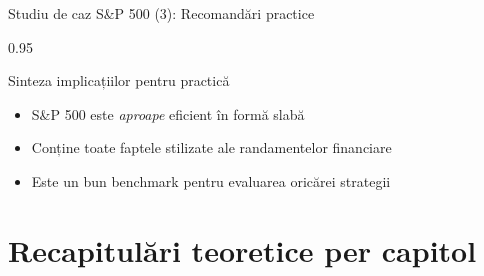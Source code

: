 \documentclass[9pt, aspectratio=169, t]{beamer}
\begin{document}
\begin{frame}[shrink=25]{Studiu de caz S\&P 500 (3): Recomandări practice}
\begin{cminipage}{0.95\textwidth}
\begin{block}{Sinteza implicațiilor pentru practică}
\begin{itemize}
    \begin{itemize}\setlength{\itemsep}{0pt}
        \item S\&P 500 este \emph{aproape} eficient în formă slabă
        \item Conține toate faptele stilizate ale randamentelor financiare
        \item Este un bun benchmark pentru evaluarea oricărei strategii
    \end{itemize}
\end{itemize}
\end{block}
\end{cminipage}
\end{frame}

\section{Recapitulări teoretice per capitol}
\end{document}
